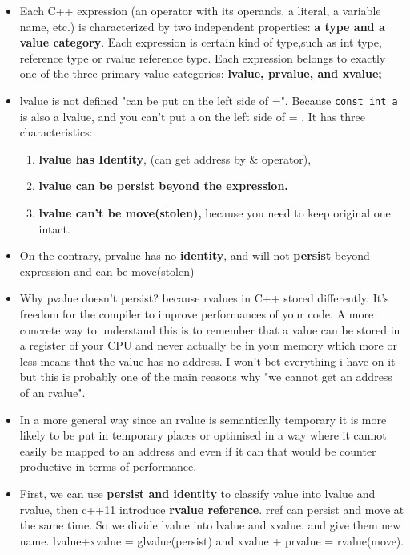 \documentclass[a4paper,12pt,twoside]{book}
\begin{document}
\begin{itemize}
	\item Each C++ expression (an operator with its operands, a literal, a variable name, etc.) is characterized by two independent properties: \textbf{a type and a value category}. Each expression is certain kind of type,such as int type, reference type or rvalue reference type. Each expression belongs to exactly one of the three primary value categories: \textbf{lvalue, prvalue, and xvalue;} 
	
	\item lvalue is not defined "can be put on the left side of =". Because \texttt{const int a} is also a lvalue, and you can't put a on the left side of = . It has three characteristics:
	\begin{enumerate}
		\item\textbf{lvalue has Identity}, (can get address by \& operator),
		\item \textbf{lvalue can be persist beyond the expression. }
		\item \textbf{lvalue can't be move(stolen),} because you need to keep original one intact.
	\end{enumerate}
	
	\item On the contrary, prvalue has no \textbf{identity}, and will not \textbf{persist} beyond expression and can be move(stolen)
	
	\item Why pvalue doesn't persist? because rvalues in C++ stored differently. It's freedom for the compiler to improve performances of your code. A more concrete way to understand this is to remember that a value can be stored in a register of your CPU and never actually be in your memory which more or less means that the value has no address. I won't bet everything i have on it but this is probably one of the main reasons why "we cannot get an address of an rvalue".
	
	\item In a more general way since an rvalue is semantically temporary it is more likely to be put in temporary places or optimised in a way where it cannot easily be mapped to an address and even if it can that would be counter productive in terms of performance.
	
	\item First, we can use \textbf{persist and identity} to classify value into lvalue and rvalue, then c++11 introduce \textbf{rvalue reference}. rref can persist and move at the same time.  So we divide lvalue into lvalue and xvalue.  and give them new name.  lvalue+xvalue = glvalue(persist)  and xvalue + prvalue = rvalue(move).
	

\end{itemize}
\end{document}
